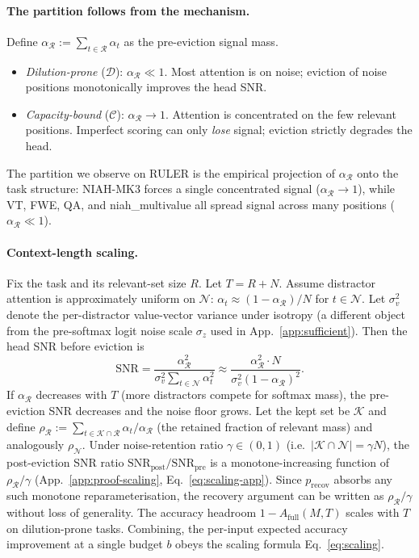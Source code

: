 \documentclass{article}
\begin{document}
\paragraph{The partition follows from the mechanism.}
Define $\alpha_{\mathcal{R}} := \sum_{t \in \mathcal{R}} \alpha_t$ as the
pre-eviction signal mass.
\begin{itemize}
  \item \emph{Dilution-prone} ($\mathcal{D}$): $\alpha_{\mathcal{R}} \ll 1$.
  Most attention is on noise; eviction of noise positions monotonically
  improves the head SNR.
  \item \emph{Capacity-bound} ($\mathcal{C}$): $\alpha_{\mathcal{R}} \to 1$.
  Attention is concentrated on the few relevant positions. Imperfect
  scoring can only \emph{lose} signal; eviction strictly degrades the
  head.
\end{itemize}
The partition we observe on RULER is the empirical projection of
$\alpha_{\mathcal{R}}$ onto the task structure: NIAH-MK3 forces a
single concentrated signal ($\alpha_{\mathcal{R}} \to 1$), while VT, FWE,
QA, and niah\_multivalue all spread signal across many positions
($\alpha_{\mathcal{R}} \ll 1$).

\paragraph{Context-length scaling.}
Fix the task and its relevant-set size $R$. Let $T = R + N$. Assume
distractor attention is approximately uniform on $\mathcal{N}$:
$\alpha_t \approx (1 - \alpha_{\mathcal{R}}) / N$ for $t \in \mathcal{N}$.
Let $\sigma_v^2$ denote the per-distractor value-vector variance under
isotropy (a different object from the pre-softmax logit noise scale
$\sigma_z$ used in App.~\ref{app:sufficient}). Then the head SNR before
eviction is
\[
\mathrm{SNR} = \frac{\alpha_{\mathcal{R}}^2}{\sigma_v^2 \sum_{t \in \mathcal{N}}
\alpha_t^2} \approx \frac{\alpha_{\mathcal{R}}^2 \cdot N}{\sigma_v^2 (1 -
\alpha_{\mathcal{R}})^2}.
\]
If $\alpha_{\mathcal{R}}$ decreases with $T$ (more distractors compete for
softmax mass), the pre-eviction SNR decreases and the noise floor grows.
Let the kept set be $\mathcal{K}$ and define $\rho_{\mathcal{R}} :=
\sum_{t \in \mathcal{K} \cap \mathcal{R}} \alpha_t / \alpha_{\mathcal{R}}$
(the retained fraction of relevant mass) and analogously $\rho_{\mathcal{N}}$.
Under noise-retention ratio $\gamma \in (0, 1)$ (i.e.\ $|\mathcal{K} \cap
\mathcal{N}| = \gamma N$), the post-eviction SNR ratio
$\mathrm{SNR}_{\mathrm{post}} / \mathrm{SNR}_{\mathrm{pre}}$ is a
monotone-increasing function of $\rho_{\mathcal{R}} / \gamma$
(App.~\ref{app:proof-scaling}, Eq.~\eqref{eq:scaling-app}). Since
$p_{\mathrm{recov}}$ absorbs any such monotone reparameterisation, the
recovery argument can be written as $\rho_{\mathcal{R}} / \gamma$ without
loss of generality. The accuracy headroom $1 - A_{\mathrm{full}}(M, T)$
scales with $T$ on dilution-prone tasks. Combining, the per-input expected
accuracy improvement at a single budget $b$ obeys the scaling formula
Eq.~\eqref{eq:scaling}.
\end{document}
